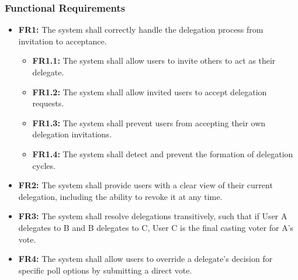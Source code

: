 \subsubsection{Functional Requirements}
\begin{itemize}
    \item \textbf{FR1:} The system shall correctly handle the delegation process from invitation to acceptance.
    \begin{itemize}
        \item \textbf{FR1.1:} The system shall allow users to invite others to act as their delegate.
        \item \textbf{FR1.2:} The system shall allow invited users to accept delegation requests.
        \item \textbf{FR1.3:} The system shall prevent users from accepting their own delegation invitations.
        \item \textbf{FR1.4:} The system shall detect and prevent the formation of delegation cycles.
    \end{itemize}

    \item \textbf{FR2:} The system shall provide users with a clear view of their current delegation, including the ability to revoke it at any time.

    \item \textbf{FR3:} The system shall resolve delegations transitively, such that if User A delegates to B and B delegates to C, User C is the final casting voter for A's vote.

    \item \textbf{FR4:} The system shall allow users to override a delegate's decision for specific poll options by submitting a direct vote.
\end{itemize}

